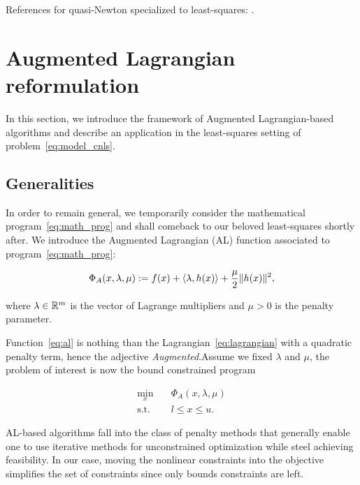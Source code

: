 \documentclass[10pt]{article}
\numberwithin{equation}{section}
\begin{document}
	 References for quasi-Newton specialized to least-squares: \cite{dennisetal:1981,yabetakahashi}.
	 
	 \section{Augmented Lagrangian reformulation}\label{sec:about_al}
	 
	 In this section, we introduce the framework of Augmented Lagrangian-based algorithms and describe an application in the least-squares setting of problem~\eqref{eq:model_cnls}.
	 
	 \subsection{Generalities}
	 
	 In order to remain general, we temporarily consider the mathematical program~\eqref{eq:math_prog} and shall comeback to our beloved least-squares shortly after. 
	 We introduce the Augmented Lagrangian (AL) function associated to program~\eqref{eq:math_prog}:
	 
	 \begin{equation}
	 	\label{eq:al}
	 	\Phi_A(x,\lambda,\mu) := f(x) + \left\langle {\lambda} , {h(x)} \right\rangle + \dfrac{\mu}{2} \|h(x)\|^2,
	 \end{equation}
	 
	 where $\lambda\in {\mathbb{R}}^m$ is the vector of Lagrange multipliers and $\mu > 0$ is the penalty parameter.
	 
	 Function~\eqref{eq:al} is nothing than the Lagrangian~\eqref{eq:lagrangian} with a quadratic penalty term, hence the adjective \textit{Augmented}.Assume we fixed $\lambda$ and $\mu$, the problem of interest is now the bound constrained program
	 
	 \begin{equation}\label{eq:al_nlp}
	 	\begin{aligned}
	 		\min_x \quad & \Phi_A(x,\lambda,\mu) \\
	 		\text{s.t.} \quad & l \le x \le u.
	 	\end{aligned}
	 \end{equation}
	 
	 AL-based algorithms fall into the class of penalty methods that generally enable one to use iterative methods for unconstrained optimization  while steel achieving feasibility. In our case, moving the nonlinear constraints into the objective simplifies the set of constraints since only bounds constraints are left.
	 
\end{document}
